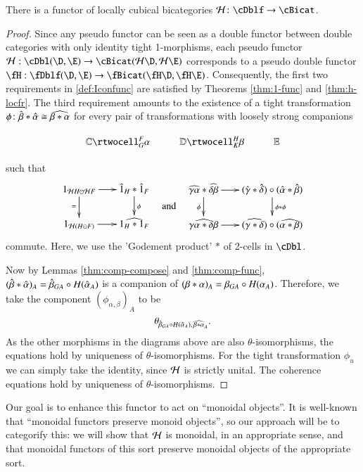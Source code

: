 \begin{thm}\label{thm:h-functor}
  There is a functor of locally cubical bicategories $\cH\maps \cDblf\to \cBicat$.
\end{thm}
\begin{proof}
Since any pseudo functor can be seen as a double functor between double categories with only identity tight 1-morphisms, each pseudo functor $\cH: \cDbl(\D,\E) \rightarrow \cBicat(\cH\D, \cH \E)$ corresponds to a pseudo double functor $\fH: \fDblf(\D,\E) \rightarrow \fBicat(\fH\D, \fH \E)$. Consequently, the first two requirements in \autoref{def:Iconfunc} are satisfied by Theorems \ref{thm:1-func} and \ref{thm:h-locfr}.
The third requirement amounts to the existence of a tight transformation $\phi\colon \hat{\beta} * \hat{\alpha} \cong \widehat{\beta*\alpha}$ for every pair of transformations with loosely strong companions 

  \[\vcenter{\xymatrix{\lC \rtwocell^F_G{\al} & \lD \rtwocell^H_K{\be}
      & \lE}}\]
      
      such that 
%
 \begin{equation}
        \vcenter{\xymatrix@-.5pc{
        1_{{\cH}H \odot {\cH}F} \ar[r]\ar[d]_{=} &
        \hat{1}_{H}* \hat{1}_{F}\ar[d]^{\phi}\\
        1_{{\cH}(H \odot F)}\ar[r] &
        \widehat{1_{H} * 1_{F}}}} \quad\text{and}\quad       
    \vcenter{\xymatrix@-.5pc{
        \widehat{\gm\al}* \widehat{\de\be} \ar[r]\ar[d]_\phi &
        (\gmhat* \dehat)\circ(\alhat* \behat)\ar[d]^{\phi * \phi}\\
        \widehat{\gm\al* \de\be}\ar[r] &
        (\widehat{\gm* \de})\circ(\widehat{\al* \be})}}
  \end{equation}
commute. 
Here, we use the 'Godement product' $*$ of 2-cells in $\cDbl$.  

  Now by Lemmas \ref{thm:comp-compose} and
  \ref{thm:comp-func}, $(\hat{\beta} *\hat{\alpha})_A = \hat{\beta}_{GA} \circ
  H(\hat{\alpha}_A)$ is a companion of $(\beta*\alpha)_A = \beta_{GA} \circ
  H(\alpha_A)$.  Therefore, we take the component $(\phi_{\alpha,\beta})_A$ to be
  \[\theta_{\hat{\beta}_{GA} \circ H(\hat{\alpha}_A),\, \widehat{\beta*\alpha}_A}.\]
 As the other morphisms in the diagrams above are also $\theta$-isomorphisms, the equations hold by uniqueness of $\theta$-isomorphisms.
For the tight transformation  $\phi_u$ we can simply take the identity, since $\mathcal{H}$ is strictly unital.
The coherence equations hold by uniqueness of $\theta$-isomorphisms.
\end{proof}

Our goal is to enhance this functor to act on ``monoidal objects''.
It is well-known that ``monoidal functors preserve monoid objects'', so our approach will be to categorify this: we will show that $\mathcal{H}$ is monoidal, in an appropriate sense, and that monoidal functors of this sort preserve monoidal objects of the appropriate sort.

